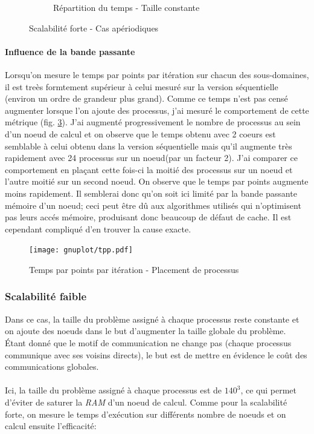 \begin{figure}[!ht]
\begin{subfigure}[b]{0.5\textwidth}
    \caption{\label{fig:strong_aper_const}Répartition du temps - Taille constante}
  \end{subfigure}
  \caption{\label{fig:bench_strong_aper}Scalabilité forte - Cas apériodiques}
\end{figure}


\paragraph{Influence de la bande passante}
Lorsqu'on mesure le temps par points par itération sur chacun des sous-domaines, il est treès formtement supérieur à celui mesuré sur la version séquentielle (environ un ordre de grandeur plus grand). Comme ce temps n'est pas censé augmenter lorsque l'on ajoute des processus, j'ai mesuré le comportement de cette métrique (fig. \ref{fig:tpp_par}). J'ai augmenté progressivement le nombre de processus au sein d'un noeud de calcul et on observe que le temps obtenu avec 2 coeurs est semblable à celui obtenu dans la version séquentielle mais qu'il augmente très rapidement avec 24 processus sur un noeud(par un facteur 2). J'ai comparer ce comportement en plaçant cette fois-ci la moitié des processus sur un noeud et l'autre moitié sur un second noeud. On observe que le temps par points augmente moins rapidement. Il semblerai donc qu'on soit ici limité par la bande passante mémoire d'un noeud; ceci peut être dû aux algorithmes utilisés qui n'optimisent pas leurs accés mémoire, produisant donc beaucoup de défaut de cache. Il est cependant compliqué d'en trouver la cause exacte.


\begin{figure}[ht]
  \centering
  \texttt{[image: gnuplot/tpp.pdf]}
  \caption{\label{fig:tpp_par} Temps par points par itération - Placement de processus}
\end{figure}


\subsubsection{Scalabilité faible}\label{sec:scal-weak}
Dans ce cas, la taille du problème assigné à chaque processus reste constante et on ajoute des noeuds dans le but d'augmenter la taille globale du problème. Étant donné que le motif de communication ne change pas (chaque processus communique avec ses voisins directs), le but est de mettre en évidence le coût des communications globales.

\paragraph{}Ici, la taille du problème assigné à chaque processus est de $140^3$, ce qui permet d'éviter de saturer la \textit{RAM} d'un noeud de calcul. Comme pour la scalabilité forte, on mesure le temps d'exécution sur différents nombre de noeuds et on calcul ensuite l'efficacité:


